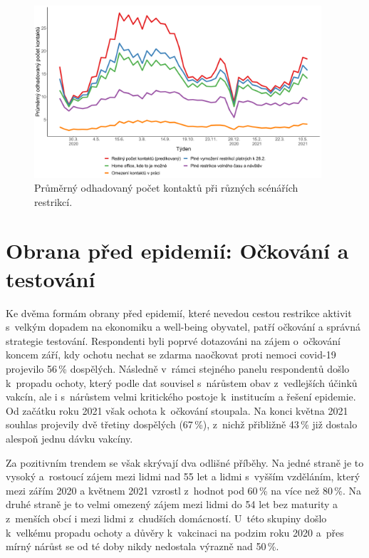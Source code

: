 \begin{figure}[ht]
    \centering
    \includegraphics[width=0.95\textwidth]{./pic/zbp-graf5.png}
    \caption{Průměrný odhadovaný počet kontaktů při různých scénářích restrikcí.}
    \label{fig:zbp5}
\end{figure}

\vspace{-0.8eM}

\section*{Obrana před epidemií: Očkování a testování}

\vspace{-0.4eM}

Ke dvěma formám obrany před epidemií, které nevedou cestou restrikce aktivit s velkým dopadem na ekonomiku a well-being obyvatel, patří očkování a správná strategie testování. Respondenti  byli poprvé dotazováni na zájem o~očkování koncem září, kdy ochotu nechat se zdarma naočkovat proti nemoci covid-19 projevilo 56\,\% dospělých. Následně v rámci stejného panelu respondentů došlo k propadu ochoty, který podle dat souvisel s nárůstem obav z vedlejších účinků vakcín, ale i s nárůstem velmi kritického postoje k institucím a řešení epidemie. Od začátku roku 2021 však ochota k očkování stoupala. Na konci května 2021 souhlas projevily dvě třetiny dospělých (67\,\%), z nichž přibližně 43\,\% již dostalo alespoň jednu dávku vakcíny. 

Za pozitivním trendem se však skrývají dva odlišné příběhy. Na jedné straně je to vysoký a rostoucí zájem mezi lidmi nad 55 let a lidmi s vyšším vzděláním, který mezi zářím 2020 a květnem 2021 vzrostl z hodnot pod 60\,\% na více než 80\,\%. Na druhé straně je to velmi omezený zájem mezi lidmi do 54 let bez maturity a z menších obcí i mezi lidmi z~chudších domácností. U této skupiny došlo k velkému propadu ochoty a důvěry k vakcinaci na podzim roku 2020 a přes mírný nárůst se od té doby nikdy nedostala výrazně nad 50\,\%. 

